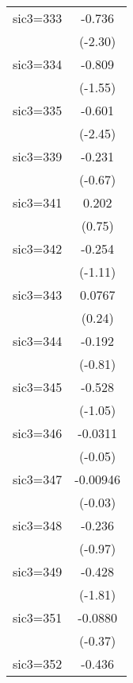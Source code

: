 \begin{table}[htbp]
\begin{tabular*}{0.8\hsize}{@{\hskip\tabcolsep\extracolsep\fill}l*{1}{c}}
\addlinespace
sic3=333            &      -0.736\sym{*}  \\
                    &     (-2.30)         \\
\addlinespace
sic3=334            &      -0.809         \\
                    &     (-1.55)         \\
\addlinespace
sic3=335            &      -0.601\sym{*}  \\
                    &     (-2.45)         \\
\addlinespace
sic3=339            &      -0.231         \\
                    &     (-0.67)         \\
\addlinespace
sic3=341            &       0.202         \\
                    &      (0.75)         \\
\addlinespace
sic3=342            &      -0.254         \\
                    &     (-1.11)         \\
\addlinespace
sic3=343            &      0.0767         \\
                    &      (0.24)         \\
\addlinespace
sic3=344            &      -0.192         \\
                    &     (-0.81)         \\
\addlinespace
sic3=345            &      -0.528         \\
                    &     (-1.05)         \\
\addlinespace
sic3=346            &     -0.0311         \\
                    &     (-0.05)         \\
\addlinespace
sic3=347            &    -0.00946         \\
                    &     (-0.03)         \\
\addlinespace
sic3=348            &      -0.236         \\
                    &     (-0.97)         \\
\addlinespace
sic3=349            &      -0.428         \\
                    &     (-1.81)         \\
\addlinespace
sic3=351            &     -0.0880         \\
                    &     (-0.37)         \\
\addlinespace
sic3=352            &      -0.436         \\

\end{tabular*}
\end{table}
